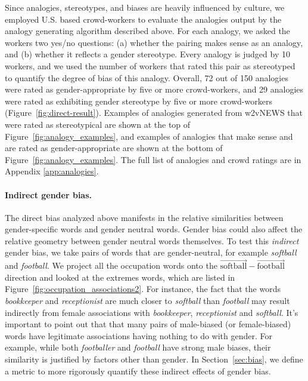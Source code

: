 \documentclass{article}
\newcommand{\wvec}[1]{\overrightarrow{\text{#1}}}
\begin{document}
Since analogies, stereotypes, and biases are heavily influenced by culture, we employed U.S. based crowd-workers to evaluate the analogies output by the analogy generating algorithm described above. For each analogy, we asked the workers two yes/no questions: (a) whether the pairing makes sense as an analogy, and (b) whether it reflects a gender stereotype. Every analogy is judged by 10 workers, and we used the number of workers that rated this pair as stereotyped to quantify the degree of bias of this analogy. Overall, 72 out of 150 analogies were rated as gender-appropriate by five or more crowd-workers, and 29 analogies were rated as exhibiting gender stereotype by five or more crowd-workers (Figure~\ref{fig:direct-result}). Examples of analogies generated from w2vNEWS that were rated as stereotypical are shown at the top of Figure~\ref{fig:analogy_examples}, and examples of analogies that make sense and are rated as gender-appropriate are shown at the bottom of Figure~\ref{fig:analogy_examples}. The full list of analogies and crowd ratings are in Appendix \ref{app:analogies}.



\paragraph{Indirect gender bias.} The direct bias analyzed above manifests in the relative similarities between gender-specific words and gender neutral words. Gender bias could also affect the relative geometry between gender neutral words themselves. To test this \emph{indirect} gender bias, we take pairs of words that are gender-neutral, for example \emph{softball} and \emph{football}. We project all the occupation words onto the $\wvec{softball} - \wvec{football}$ direction and looked at the extremes words, which are listed in Figure~\ref{fig:occupation_associations2}. 
For instance, the fact that the words {\em bookkeeper} and {\em receptionist} are much closer to {\em softball} than {\em football} may result indirectly from female associations with {\em bookkeeper}, {\em receptionist} and {\em softball}. It's important to point out that 
 that many pairs of male-biased (or female-biased) words have legitimate associations having nothing to do with gender. For example, while both {\em footballer} and {\em football} have strong male biases, their similarity is justified by factors other than gender. In Section~\ref{sec:bias}, we define a metric to more rigorously quantify these indirect effects of gender bias. 
 
\end{document}
